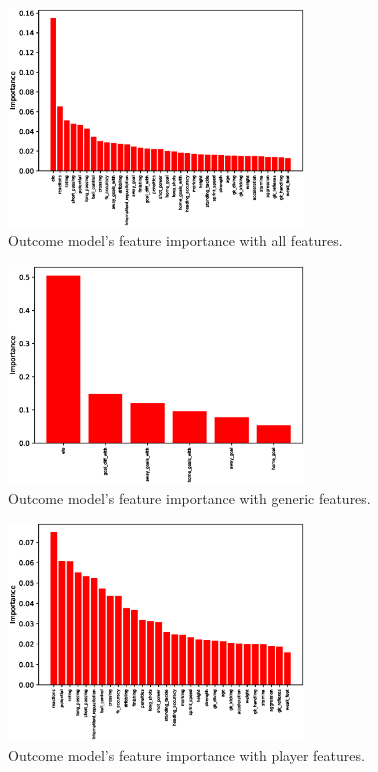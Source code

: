 \begin{figure}[H]
    \centering
    \includegraphics[width=0.7\textwidth]{img/match_level_2018_outcome_feature_importance_af_feature_importance.eps}
    \caption{Outcome model's feature importance with all features.}
    \label{fig:outcome_feature_importance_af}
\end{figure}

\begin{figure}[H]
    \centering
    \includegraphics[width=0.7\textwidth]{img/match_level_2018_outcome_feature_importance_gf_feature_importance.eps}
    \caption{Outcome model's feature importance with generic features.}
    \label{fig:outcome_feature_importance_gf}
\end{figure}

\begin{figure}[H]
    \centering
    \includegraphics[width=0.7\textwidth]{img/match_level_2018_outcome_feature_importance_pf_feature_importance.eps}
    \caption{Outcome model's feature importance with player features.}
    \label{fig:outcome_feature_importance_pf}
\end{figure}


